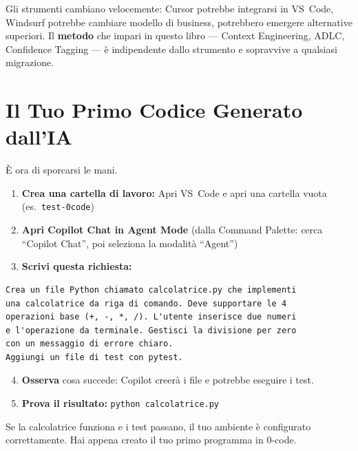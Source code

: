 \begin{warnbox}
Gli strumenti cambiano velocemente: Cursor potrebbe integrarsi in VS~Code, Windsurf potrebbe cambiare modello di business, potrebbero emergere alternative superiori. Il \textbf{metodo} che impari in questo libro --- Context Engineering, ADLC, Confidence Tagging --- è indipendente dallo strumento e sopravvive a qualsiasi migrazione.
\end{warnbox}

\section{Il Tuo Primo Codice Generato dall'IA}

È ora di sporcarsi le mani.

\begin{praticabox}[title={Pratica --- Generare una funzione Python}]
\begin{enumerate}
  \item \textbf{Crea una cartella di lavoro:} Apri VS~Code e apri una cartella vuota (es.\ \texttt{test-0code})
  \item \textbf{Apri Copilot Chat in Agent Mode} (dalla Command Palette: cerca ``Copilot Chat'', poi seleziona la modalità ``Agent'')
  \item \textbf{Scrivi questa richiesta:}
\end{enumerate}
\begin{lstlisting}
Crea un file Python chiamato calcolatrice.py che implementi
una calcolatrice da riga di comando. Deve supportare le 4
operazioni base (+, -, *, /). L'utente inserisce due numeri
e l'operazione da terminale. Gestisci la divisione per zero
con un messaggio di errore chiaro.
Aggiungi un file di test con pytest.
\end{lstlisting}
\begin{enumerate}
  \setcounter{enumi}{3}
  \item \textbf{Osserva} cosa succede: Copilot creerà i file e potrebbe eseguire i test.
  \item \textbf{Prova il risultato:} \texttt{python calcolatrice.py}
\end{enumerate}
\end{praticabox}

\begin{checkpointbox}
Se la calcolatrice funziona e i test passano, il tuo ambiente è configurato correttamente. Hai appena creato il tuo primo programma in 0-code.
\end{checkpointbox}

